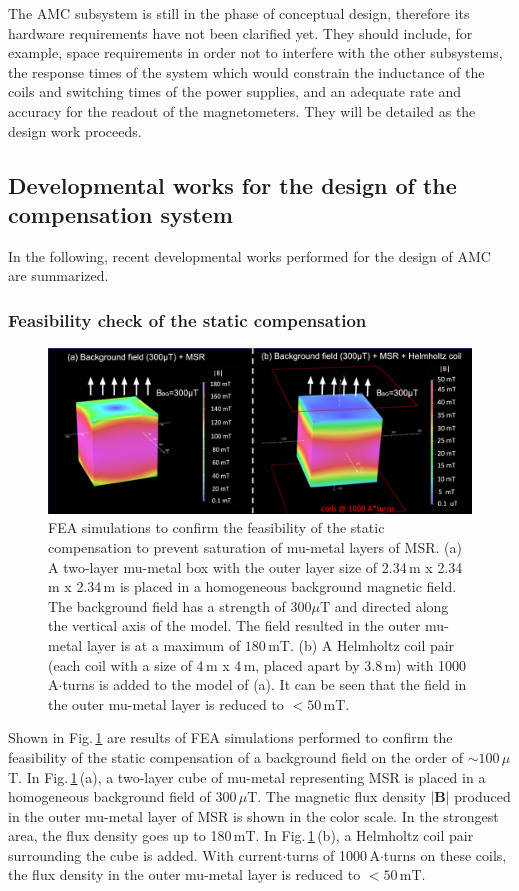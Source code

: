 The AMC subsystem is still in the phase of conceptual design, therefore its hardware requirements have not been clarified yet. 
They should include, for example, space requirements in order not to interfere with the other subsystems, the response times of the system which would constrain the inductance of the coils and switching times of the power supplies, and an adequate rate and accuracy for the readout of the magnetometers. They will be detailed as the design work proceeds. 

\subsection{Developmental works for the design of the compensation system}

In the following, recent developmental works performed for the design of AMC are summarized. 

\subsubsection{Feasibility check of the static compensation}\label{sec:amc_feasibility}
\begin{figure}[htb]
  \centering
  \includegraphics[width=\textwidth]{graphics/AMC/feasibility.png}
  \caption{FEA simulations to confirm the feasibility of the static compensation to prevent saturation of mu-metal layers of MSR. (a) A two-layer mu-metal box with the outer layer size of 2.34\,m x 2.34\,m x 2.34\,m is placed in a homogeneous background magnetic field. The background field has a strength of $300 \mu$T and directed along the vertical axis of the model. The field resulted in the outer mu-metal layer is at a maximum of $180\,$mT. (b) A Helmholtz coil pair (each coil with a size of 4\,m x 4\,m, placed apart by 3.8\,m) with 1000 A$\cdot$turns is added to the model of (a). It can be seen that the field in the outer mu-metal layer is reduced to $<50\,$mT.  }
  \label{fig:amc_feasibility}
\end{figure}
Shown in Fig.\,\ref{fig:amc_feasibility} are results of FEA simulations performed to confirm the feasibility of the static compensation of a background field on the order of $\sim 100\,\mu$T. In Fig.\,\ref{fig:amc_feasibility}\,(a), a two-layer cube of mu-metal representing MSR is placed in a homogeneous background field of $300\,\mu$T. The magnetic flux density $|\mathbf{B}|$ produced in the outer mu-metal layer of MSR is shown in the color scale. In the strongest area, the flux density goes up to 180\,mT. In Fig.\,\ref{fig:amc_feasibility}\,(b), a Helmholtz coil pair surrounding the cube is added. With current$\cdot$turns of 1000\,A$\cdot$turns on these coils, the flux density in the outer mu-metal layer is reduced to $<50$\,mT.

